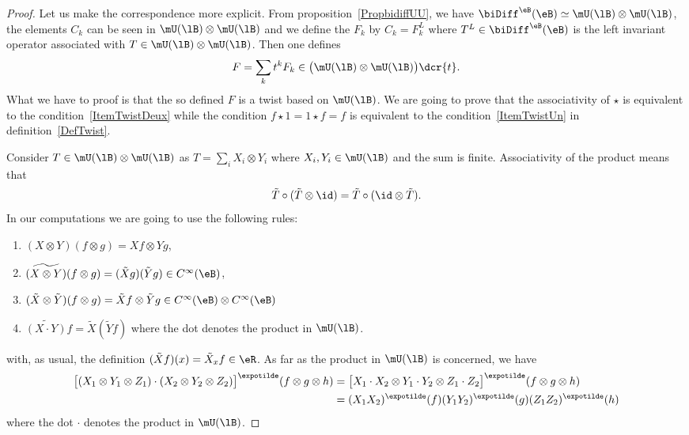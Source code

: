 \begin{proof}
	Let us make the correspondence more explicit. From proposition~\ref{PropbidiffUU}, we have $\biDiff^{\eB}(\eB)\simeq\mU(\lB)\otimes\mU(\lB)$, the elements $C_k$ can be seen in $\mU(\lB)\otimes\mU(\lB)$ and we define the $F_k$ by $C_k=F_k^L$ where $T^L\in\biDiff^{\eB}(\eB)$ is the left invariant operator associated with $T\in\mU(\lB)\otimes\mU(\lB)$. Then one defines
	\begin{equation}
		F=\sum_kt^kF_k\in\big( \mU(\lB)\otimes\mU(\lB) \big)\dcr{t}.
	\end{equation}
	What we have to proof is that the so defined $F$ is a twist based on $\mU(\lB)$. We are going to prove that the associativity of $\star$ is equivalent to the condition~\ref{ItemTwistDeux} while the condition $f\star 1=1\star f=f$ is equivalent to the condition~\ref{ItemTwistUn} in definition~\ref{DefTwist}.

	Consider $T\in\mU(\lB)\otimes\mU(\lB)$ as $T=\sum_i X_i\otimes Y_i$ where $X_i,Y_i\in\mU(\lB)$ and the sum is finite. Associativity of the product means that
	\begin{equation}
		\tilde T\circ(\tilde T\otimes \id)=\tilde T\circ(\id\otimes \tilde T).
	\end{equation}
	In our computations we are going to use the following rules:
	\begin{enumerate}

		\item
			$(X\otimes Y)(f\otimes g)=Xf\otimes Yg$,
		\item	 \label{ItemOptimRuleDeux}
			$\widetilde{(X\otimes Y)}(f\otimes g)=(\tilde Xg)(\tilde Yg)\in  C^{\infty}(\eB)$,
		\item
			$(\tilde X\otimes \tilde Y)(f\otimes g)=\tilde Xf\otimes \tilde Yg\in C^{\infty}(\eB)\otimes C^{\infty}(\eB)$
		\item
			$\widetilde{(X\cdot Y)}f=\tilde X(\tilde Yf)$ where the dot denotes the product in $\mU(\lB)$.

	\end{enumerate}
	with, as usual, the definition $(\tilde Xf)(x)=\tilde X_xf\in \eR$. As far as the product in $\mU(\lB)$ is concerned, we have
	\begin{equation}
		\begin{aligned}[]
			\big[ (X_1\otimes Y_1\otimes Z_1)\cdot (X_2\otimes Y_2\otimes Z_2) \big]^{\expotilde}(f\otimes g\otimes h)&=
			\big[ X_1\cdot X_2\otimes Y_1\cdot Y_2\otimes Z_1\cdot Z_2 \big]^{\expotilde}(f\otimes g\otimes h)\\
			&=(X_1X_2)^{\expotilde}(f)(Y_1Y_2)^{\expotilde}(g)(Z_1Z_2)^{\expotilde}(h)
		\end{aligned}
	\end{equation}
	where the dot $\cdot$ denotes the product in $\mU(\lB)$.


\end{proof}
